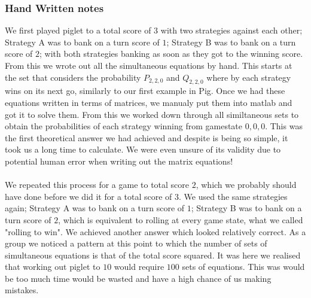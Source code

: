 \documentclass[a4paper,titlepage]{article}
\begin{document}
\subsubsection{Hand Written notes}
We first played piglet to a total score of $3$ with two strategies against each other; Strategy A was to bank on a turn score of $1$; Strategy B was to bank on a turn score of $2$; with both strategies banking as soon as they got to the winning score.
From this we wrote out all the simultaneous equations by hand. This starts at the set that considers the probability $P_{2,2,0}$ and $Q_{2,2,0}$ where by each strategy wins on its next go, similarly to our first example in Pig.
Once we had these equations written in terms of matrices, we manualy put them into matlab and got it to solve them. From this we worked down through all similtaneous sets to obtain the probabilities of each strategy winning from gamestate $0,0,0$.
This was the first theoretical answer we had achieved and despite is being so simple, it took us a long time to calculate. We were even unsure of its validity due to potential human error when writing out the matrix equations!
\\
\\
We repeated this process for a game to total score $2$, which we probably should have done before we did it for a total score of $3$.
We used the same strategies again; Strategy A was to bank on a turn score of $1$; Strategy B was to bank on a turn score of $2$, which is equivalent to rolling at every game state, what we called "rolling to win".
We achieved another answer which looked relatively correct. As a group we noticed a pattern at this point to which the number of sets of simultaneous equations is that of the total score squared.
It was here we realised that working out piglet to $10$ would require $100$ sets of equations. This was would be too much time would be wasted and have a high chance of us making mistakes.
\end{document}
